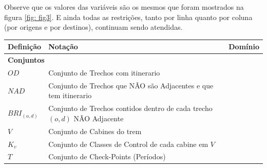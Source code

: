 Observe que os valores das variáveis são os mesmos que foram mostrados na figura \ref{fig: fig3}. E ainda todas as restrições, tanto por linha quanto por coluna (por origens e por destinos), continuam sendo atendidas.

\begin{table}[h]
	\centering
	\small
	\begin{tabular}{p{2cm} p{9.5cm} p{3.2cm}}
		\toprule
		\textbf{Definição} & \textbf{Notação}                                                                                                                                            & \textbf{Domínio}                             \\ \midrule
		\multicolumn{3}{l}{\textbf{Conjuntos}}                                                                                                                                                                                          \\ \midrule
		$OD$               & Conjunto de Trechos com itinerario                                                                                                                          &                                              \\
		$NAD$              & Conjunto de Trechos que NÃO são Adjacentes e que tem itinerario                                                                                             &                                              \\
		$BRI_{(o,d)}$      & Conjunto de Trechos contidos dentro de cada trecho $(o,d)$ NÃO Adjacente                                                                                    &                                              \\
		$V$                & Conjunto de Cabines do trem                                                                                                                                 &                                              \\
		$K_v$              & Conjunto de Classes de Control de cada cabine em $V$                                                                                                        &                                              \\
		$T$                & Conjunto de Check-Points (Períodos)                                                                                                                         &                                              \\ \midrule

\end{tabular}
\end{table}
